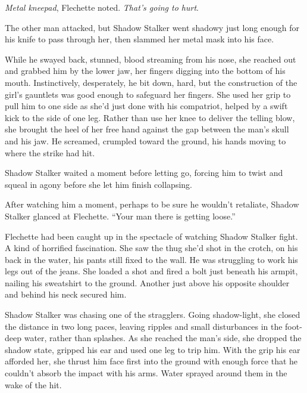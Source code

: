 \emph{Metal kneepad}, Flechette noted.  \emph{That's going to hurt}.



The other man attacked, but Shadow Stalker went shadowy just long enough for his knife to pass through her, then slammed her metal mask into his face.



While he swayed back, stunned, blood streaming from his nose, she reached out and grabbed him by the lower jaw, her fingers digging into the bottom of his mouth.  Instinctively, desperately, he bit down, hard, but the construction of the girl's gauntlets was good enough to safeguard her fingers.  She used her grip to pull him to one side as she'd just done with his compatriot, helped by a swift kick to the side of one leg.  Rather than use her knee to deliver the telling blow, she brought the heel of her free hand against the gap between the man's skull and his jaw.  He screamed, crumpled toward the ground, his hands moving to where the strike had hit.



Shadow Stalker waited a moment before letting go, forcing him to twist and squeal in agony before she let him finish collapsing.



After watching him a moment, perhaps to be sure he wouldn't retaliate, Shadow Stalker glanced at Flechette.  ``Your man there is getting loose.''



Flechette had been caught up in the spectacle of watching Shadow Stalker fight.  A kind of horrified fascination.  She saw the thug she'd shot in the crotch, on his back in the water, his pants still fixed to the wall.  He was struggling to work his legs out of the jeans.  She loaded a shot and fired a bolt just beneath his armpit, nailing his sweatshirt to the ground.  Another just above his opposite shoulder and behind his neck secured him.



Shadow Stalker was chasing one of the stragglers.  Going shadow-light, she closed the distance in two long paces, leaving ripples and small disturbances in the foot-deep water, rather than splashes.  As she reached the man's side, she dropped the shadow state, gripped his ear and used one leg to trip him.  With the grip his ear afforded her, she thrust him face first into the ground with enough force that he couldn't absorb the impact with his arms.  Water sprayed around them in the wake of the hit.



